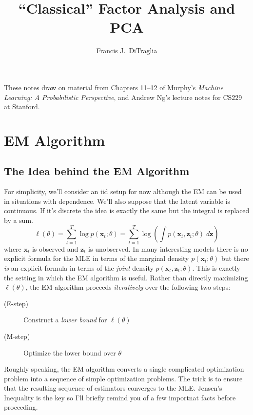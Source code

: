 \documentclass[12pt]{article}
\theoremstyle{definition}
\begin{document}
\title{``Classical'' Factor Analysis and PCA}

\author{Francis J.\ DiTraglia}

\maketitle 

\noindent 
These notes draw on material from Chapters 11--12 of Murphy's \emph{Machine Learning: A Probabilistic Perspective}, and Andrew Ng's lecture notes for CS229 at Stanford.

\section{EM Algorithm}


\subsection{The Idea behind the EM Algorithm}
For simplicity, we'll consider an iid setup for now although the EM can be used in situations with dependence. We'll also suppose that the latent variable is continuous. If it's discrete the idea is exactly the same but the integral is replaced by a sum.
	$$\ell(\theta) = \sum_{t=1}^T \log p(\textbf{x}_t;\theta) = \sum_{t=1}^T \log \left(\int p(\textbf{x}_t,	\textbf{z}_t;\theta)\; d \textbf{z} \right)$$
where $\mathbf{x}_t$ is observed and $\mathbf{z}_t$ is unobserved. In many interesting models there is no explicit formula for the MLE in terms of the marginal density $p(\mathbf{x}_t;\theta)$ but there \emph{is} an explicit formula in terms of the \emph{joint} density $p(\mathbf{x}_t,\mathbf{z}_t;\theta)$. This is exactly the setting in which the EM algorithm is useful. Rather than directly maximizing $\ell(\theta)$, the EM algorithm proceeds \emph{iteratively} over the following two steps:
	\begin{description}
		\item[(E-step)] Construct a \emph{lower bound} for $\ell(\theta)$
		\item[(M-step)] Optimize the lower bound over $\theta$
	\end{description}
Roughly speaking, the EM algorithm converts a single complicated optimization problem into a sequence of simple optimization problems. The trick is to ensure that the resulting sequence of estimators converges to the MLE. Jensen's Inequality is the key so I'll briefly remind you of a few importnat facts before proceeding. 
\end{document}
